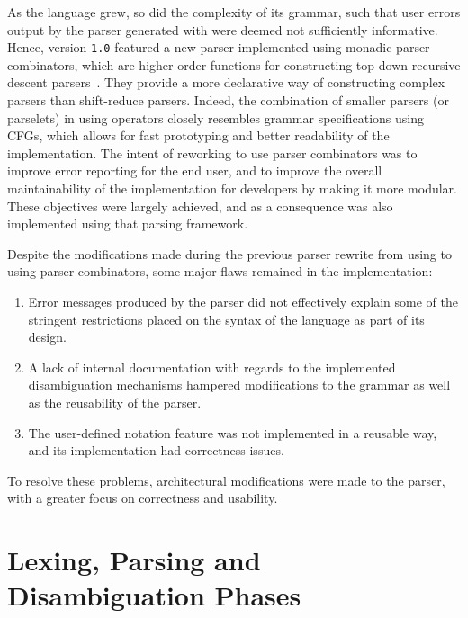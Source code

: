 As the \Beluga language grew, so did the complexity of its grammar, such that user errors output by the parser generated with \CamlpFour were deemed not sufficiently informative.
Hence, \Beluga version \texttt{1.0} featured a new parser implemented using monadic parser combinators, which are higher-order functions for constructing top-down recursive descent parsers~\cite{Burge1975-BURRPT, hutton1996monadic, leijen2001parsec, generalparsercombs, afroozeh2019practical}.
They provide a more declarative way of constructing complex parsers than shift-reduce parsers.
Indeed, the combination of smaller parsers (or parselets) in \OCaml using operators closely resembles grammar specifications using \acp{CFG}, which allows for fast prototyping and better readability of the implementation.
The intent of reworking \Beluga to use parser combinators was to improve error reporting for the end user, and to improve the overall maintainability of the implementation for developers by making it more modular.
These objectives were largely achieved, and as a consequence \Harpoon was also implemented using that parsing framework.

Despite the modifications made during the previous parser rewrite from using \CamlpFour to using parser combinators, some major flaws remained in the implementation:
\begin{enumerate}
\item
Error messages produced by the parser did not effectively explain some of the stringent restrictions placed on the syntax of the language as part of its design.
\item
A lack of internal documentation with regards to the implemented disambiguation mechanisms hampered modifications to the grammar as well as the reusability of the parser.
\item
The user-defined notation feature was not implemented in a reusable way, and its implementation had correctness issues.
\end{enumerate}
To resolve these problems, architectural modifications were made to the parser, with a greater focus on correctness and usability.

\section{\Beluga Lexing, Parsing and Disambiguation Phases}\label{section:lexing-parsing-disambiguation}

